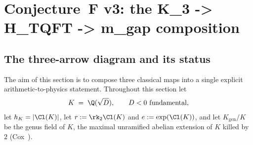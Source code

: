 %
%
%
%

\section{Conjecture~F v3: the K_3 -> H_{TQFT} -> m_{gap} composition}
\label{sec:conj-F-v3}

\subsection{The three-arrow diagram and its status}
\label{sec:conjF-diagram}

The aim of this section is to compose three classical maps into a
single explicit arithmetic-to-physics statement.  Throughout this
section let
\[
   K \;=\; \Q(\sqrt{D}), \qquad D < 0 \text{ fundamental},
\]
let $h_K = |\Cl(K)|$, let $r := \rk_2 \Cl(K)$ and
$e := \exp(\Cl(K))$, and let $K_{\mathrm{gen}}/K$ be the genus field of
$K$, the maximal unramified abelian extension of $K$ killed by~$2$
(Cox~\cite[Thm.~6.1]{Cox1989}).

